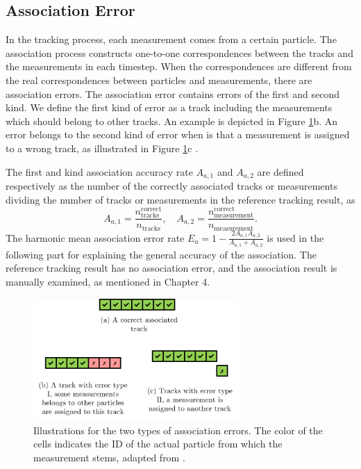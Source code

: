 \subsection{Association Error}
\label{Association Error}

In the tracking process, each measurement comes from a certain particle. The association process constructs one-to-one correspondences between the tracks and the measurements in each timestep. When the correspondences are different from the real correspondences between particles and measurements, there are association errors. The association error contains errors of the first and second kind. We define the first kind of error as a track including the measurements which should belong to other tracks. An example is depicted in Figure \ref{asso err}b. An error belongs to the second kind of error when is that a measurement is assigned to a wrong track, as illustrated in Figure \ref{asso err}c \cite{pfaff2019multitarget}. 

The first and kind association accuracy rate $A_{a,1}$ and $A_{a,2}$ are defined respectively as the number of the correctly associated tracks or measurements dividing the number of tracks or measurements in the reference tracking result, as
\begin{equation}
    A_{a,1}=\frac{n_{\mathrm{tracks}}^{\mathrm{correct}}}{n_{\mathrm{tracks}}},\quad
    A_{a,2}=\frac{n_{\mathrm{measurement}}^{\mathrm{correct}}}{n_{\mathrm{measurement}}}.
\end{equation}
The harmonic mean association error rate $E_{a}=1-\frac{2A_{a,1}A_{a,2}}{A_{a,1}+A_{a,2}}$ is used in the following part for explaining the general accuracy of the association. The reference tracking result has no association error, and the association result is manually examined, as mentioned in Chapter 4.


\begin{figure}[htbp]
\centering
\includegraphics[width=0.7\textwidth]{figures/Asso/association error.png}
\caption{Illustrations for the two types of association errors. The color of the cells indicates the ID of the actual particle from which the measurement stems, adapted from \cite{pfaff2019multitarget}.}
\label{asso err}
\end{figure}

